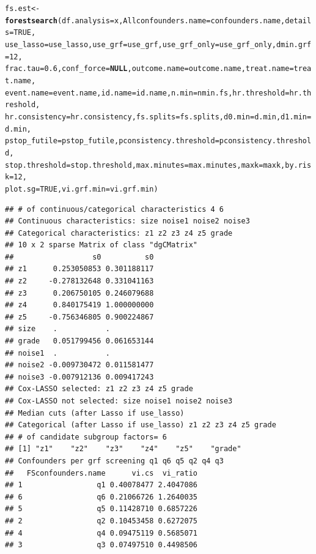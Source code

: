 \documentclass[smallextended]{svjour3}
\makeatletter
\newcommand{\hlnum}[1]{\textcolor[rgb]{0.686,0.059,0.569}{#1}}%
\newcommand{\hlstd}[1]{\textcolor[rgb]{0.345,0.345,0.345}{#1}}%
\newcommand{\hlkwa}[1]{\textcolor[rgb]{0.161,0.373,0.58}{\textbf{#1}}}%
\newcommand{\hlkwb}[1]{\textcolor[rgb]{0.69,0.353,0.396}{#1}}%
\newcommand{\hlkwc}[1]{\textcolor[rgb]{0.333,0.667,0.333}{#1}}%
\newcommand{\hlkwd}[1]{\textcolor[rgb]{0.737,0.353,0.396}{\textbf{#1}}}%
\newenvironment{kframe}{%
 \def\at@end@of@kframe{}%
 \ifinner\ifhmode%
  \def\at@end@of@kframe{\end{minipage}}%
  \begin{minipage}{\columnwidth}%
 \fi\fi%
 \def\FrameCommand##1{\hskip\@totalleftmargin \hskip-\fboxsep
 \colorbox{shadecolor}{##1}\hskip-\fboxsep
     \hskip-\linewidth \hskip-\@totalleftmargin \hskip\columnwidth}%
 \MakeFramed {\advance\hsize-\width
   \@totalleftmargin\z@ \linewidth\hsize
   \@setminipage}}%
 {\par\unskip\endMakeFramed%
 \at@end@of@kframe}
\newenvironment{knitrout}{}{} %
\makeatother
\begin{document}
\begin{knitrout}
\begin{kframe}
\begin{alltt}
\hlstd{fs.est} \hlkwb{<-} \hlkwd{forestsearch}\hlstd{(}\hlkwc{df.analysis} \hlstd{= x,} \hlkwc{Allconfounders.name} \hlstd{= confounders.name,} \hlkwc{details} \hlstd{=} \hlnum{TRUE}\hlstd{,}
    \hlkwc{use_lasso} \hlstd{= use_lasso,} \hlkwc{use_grf} \hlstd{= use_grf,} \hlkwc{use_grf_only} \hlstd{= use_grf_only,} \hlkwc{dmin.grf} \hlstd{=} \hlnum{12}\hlstd{,}
    \hlkwc{frac.tau} \hlstd{=} \hlnum{0.6}\hlstd{,} \hlkwc{conf_force} \hlstd{=} \hlkwa{NULL}\hlstd{,} \hlkwc{outcome.name} \hlstd{= outcome.name,} \hlkwc{treat.name} \hlstd{= treat.name,}
    \hlkwc{event.name} \hlstd{= event.name,} \hlkwc{id.name} \hlstd{= id.name,} \hlkwc{n.min} \hlstd{= nmin.fs,} \hlkwc{hr.threshold} \hlstd{= hr.threshold,}
    \hlkwc{hr.consistency} \hlstd{= hr.consistency,} \hlkwc{fs.splits} \hlstd{= fs.splits,} \hlkwc{d0.min} \hlstd{= d.min,} \hlkwc{d1.min} \hlstd{= d.min,}
    \hlkwc{pstop_futile} \hlstd{= pstop_futile,} \hlkwc{pconsistency.threshold} \hlstd{= pconsistency.threshold,}
    \hlkwc{stop.threshold} \hlstd{= stop.threshold,} \hlkwc{max.minutes} \hlstd{= max.minutes,} \hlkwc{maxk} \hlstd{= maxk,} \hlkwc{by.risk} \hlstd{=} \hlnum{12}\hlstd{,}
    \hlkwc{plot.sg} \hlstd{=} \hlnum{TRUE}\hlstd{,} \hlkwc{vi.grf.min} \hlstd{= vi.grf.min)}
\end{alltt}
\begin{verbatim}
## # of continuous/categorical characteristics 4 6 
## Continuous characteristics: size noise1 noise2 noise3 
## Categorical characteristics: z1 z2 z3 z4 z5 grade 
## 10 x 2 sparse Matrix of class "dgCMatrix"
##                  s0          s0
## z1      0.253050853 0.301188117
## z2     -0.278132648 0.331041163
## z3      0.206750105 0.246079688
## z4      0.840175419 1.000000000
## z5     -0.756346805 0.900224867
## size    .           .          
## grade   0.051799456 0.061653144
## noise1  .           .          
## noise2 -0.009730472 0.011581477
## noise3 -0.007912136 0.009417243
## Cox-LASSO selected: z1 z2 z3 z4 z5 grade 
## Cox-LASSO not selected: size noise1 noise2 noise3 
## Median cuts (after Lasso if use_lasso) 
## Categorical (after Lasso if use_lasso) z1 z2 z3 z4 z5 grade 
## # of candidate subgroup factors= 6 
## [1] "z1"    "z2"    "z3"    "z4"    "z5"    "grade"
## Confounders per grf screening q1 q6 q5 q2 q4 q3 
##   FSconfounders.name      vi.cs  vi_ratio
## 1                 q1 0.40078477 2.4047086
## 6                 q6 0.21066726 1.2640035
## 5                 q5 0.11428710 0.6857226
## 2                 q2 0.10453458 0.6272075
## 4                 q4 0.09475119 0.5685071
## 3                 q3 0.07497510 0.4498506

\end{verbatim}
\end{kframe}
\end{knitrout}
\end{document}
